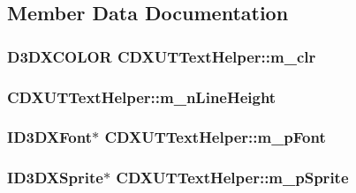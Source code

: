 \subsection{Member Data Documentation}
\hypertarget{class_c_d_x_u_t_text_helper_abda1eaccbab210b030c9386f73462502}{
\subsubsection[{m\_\-clr}]{\setlength{\rightskip}{0pt plus 5cm}D3DXCOLOR {\bf CDXUTTextHelper::m\_\-clr}}}
\label{class_c_d_x_u_t_text_helper_abda1eaccbab210b030c9386f73462502}
\hypertarget{class_c_d_x_u_t_text_helper_a2ac874c5600959730dfb09c17ac88dc2}{
\subsubsection[{m\_\-nLineHeight}]{ {\bf CDXUTTextHelper::m\_\-nLineHeight}}}
\label{class_c_d_x_u_t_text_helper_a2ac874c5600959730dfb09c17ac88dc2}
\hypertarget{class_c_d_x_u_t_text_helper_abf9fdc2bdca1ef2ff43a054a98ee8fe9}{
\subsubsection[{m\_\-pFont}]{\setlength{\rightskip}{0pt plus 5cm}ID3DXFont$\ast$ {\bf CDXUTTextHelper::m\_\-pFont}}}
\label{class_c_d_x_u_t_text_helper_abf9fdc2bdca1ef2ff43a054a98ee8fe9}
\hypertarget{class_c_d_x_u_t_text_helper_a3c32e301254b6f5473c370b4c567b53b}{
\subsubsection[{m\_\-pSprite}]{\setlength{\rightskip}{0pt plus 5cm}ID3DXSprite$\ast$ {\bf CDXUTTextHelper::m\_\-pSprite}}}
